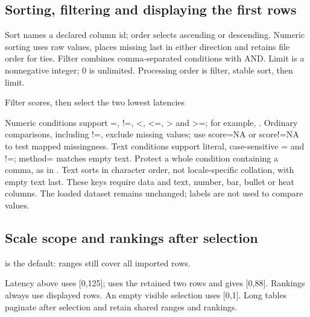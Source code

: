 \subsection{Sorting, filtering and displaying the first rows}
Sort names a declared column id; order selects ascending or descending. Numeric
sorting uses raw values, places missing last in either direction and retains
file order for ties. Filter combines comma-separated conditions with AND. Limit
is a nonnegative integer; 0 is unlimited. Processing order is filter, stable sort,
then limit.
\begin{demo}{Filter scores, then select the two lowest latencies}
\begin{gradtable}[data=results,width=\linewidth,scale=column,
  filter={score>=75},sort=time,order=ascending,limit=2,header align=c]
\end{gradtable}
\end{demo}
Numeric conditions support =, !=, <, <=, > and >=; for example,
. Ordinary comparisons, including !=, exclude missing
values; use score=NA or score!=NA to test mapped missingness. Text conditions
support literal, case-sensitive = and !=; method= matches empty text. Protect a
whole condition containing a comma, as in .
Text sorts in character order, not locale-specific collation, with empty text
last. These keys require data and text, number, bar, bullet or heat columns.
The loaded dataset remains unchanged; labels are not used to compare values.
\subsection{Scale scope and rankings after selection}
 is the default: ranges still cover all imported rows.

Latency above uses [0,125];  uses the retained two rows and
gives [0,88]. Rankings always use displayed rows. An empty visible selection uses
[0,1]. Long tables paginate after selection and retain shared ranges and rankings.


